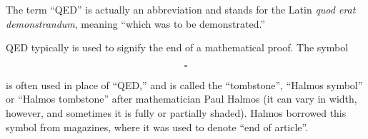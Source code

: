 \documentclass[12pt]{article}
\begin{document}
The term ``QED'' is actually an abbreviation and stands for the Latin \emph{quod erat demonstrandum}, meaning ``which was to be demonstrated.''

QED typically is used to signify the end of a mathematical proof.  The symbol 

$$ \square $$

is often used in place of ``QED,'' and is called the ``tombstone'', ``Halmos symbol'' or ``Halmos tombstone'' after mathematician Paul Halmos (it can vary in width, however, and sometimes it is fully or partially shaded).  Halmos borrowed this symbol from magazines, where it was used to denote ``end of article''.
\end{document}
